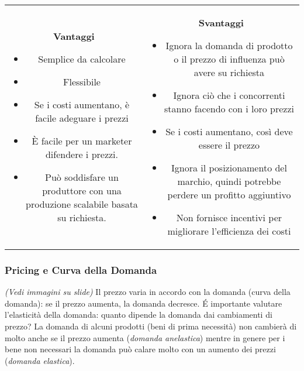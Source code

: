 \documentclass[a4paper,portrait,12pt]{article}
\theoremstyle{definition}
\begin{document}
\begin{table}
\begin{center}
\begin{tabular}{cc}
\begin{minipage}{.5\linewidth}
\textbf{Vantaggi}
\begin{itemize}
\item Semplice da calcolare
\item Flessibile
\item Se i costi aumentano, è facile adeguare i prezzi
\item È facile per un marketer difendere i prezzi.
\item Può soddisfare un produttore con una produzione scalabile basata
su richiesta.
\end{itemize}
\end{minipage}
&
\begin{minipage}{.5\linewidth}
\textbf{Svantaggi}
\begin{itemize}
\item Ignora la domanda di prodotto o il prezzo di influenza può avere
su richiesta
\item Ignora ciò che i concorrenti stanno facendo con i loro prezzi
\item Se i costi aumentano, così deve essere il prezzo
\item Ignora il posizionamento del marchio, quindi potrebbe perdere un profitto aggiuntivo
\item Non fornisce incentivi per migliorare l'efficienza dei costi
\end{itemize}
\end{minipage}
\end{tabular}
\end{center}
\end{table}


\subsubsection{Pricing e Curva della Domanda}
\emph{(Vedi immagini su slide)}
Il prezzo varia in accordo con la domanda (curva della domanda): se il prezzo aumenta, la domanda decresce.
\'E importante valutare l'elasticità della domanda: quanto dipende la domanda dai cambiamenti di prezzo?
La domanda di alcuni prodotti (beni di prima necessità) non cambierà di molto anche se il prezzo aumenta (\emph{domanda anelastica}) mentre in genere per i bene non necessari la domanda può calare molto con un aumento dei prezzi (\emph{domanda elastica}).
\end{document}

